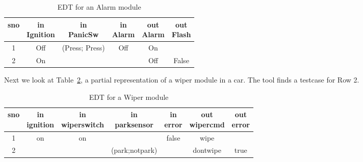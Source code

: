\begin{table}[h!]
  \centering {}
  \caption{EDT for an Alarm module}
  \label{tab:alarm-2}
  \begin{tabular}{|c|c|c|c||c|c|}
    \hline
    sno & \specialcell{in \\ Ignition} &
                                         \specialcell{in \\ PanicSw} &
                                                                       \specialcell{in 
    \\ Alarm} & \specialcell{out \\ Alarm} & 
                                             \specialcell{out \\ Flash} \\
    \hline 
    1 & Off & (Press; Press)%
    & Off & On &
    \\
    \hline

    2 & On & & & Off & False \\
    \hline
  \end{tabular}
  
\end{table}

Next we look at Table~\ref{tab:wiper}, a partial representation of a wiper module in a car. The tool finds a testcase for Row 2.

\begin{table}[h!]
  \centering {}
  \caption{EDT for a Wiper module}
  \label{tab:wiper}
  \begin{tabular}{|c|c|c|c|c||c|c|}
    \hline
    sno & \specialcell{in \\ ignition} &
                                         \specialcell{in \\ wiperswitch} & 
                                                                       \specialcell{in 
    \\ parksensor} & \specialcell{in \\ error} & \specialcell{out \\ wipercmd} & 
                                             \specialcell{out \\ error} \\
    \hline 
    1 & on & on & 
    & false & wipe &
    \\
    \hline

    2 & & & (park;notpark) & & dontwipe & true \\
    \hline
  \end{tabular}
  
\end{table}


